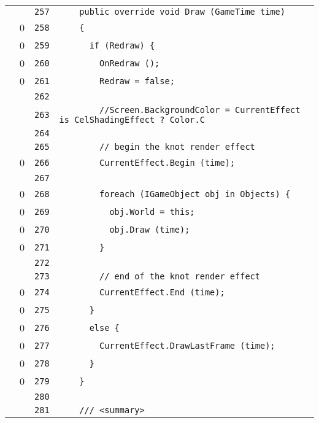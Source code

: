 \documentclass[a4paper,10pt]{article}
\begin{document}
\begin{longtable}[l]{lrrl}
\cellcolor{gray} &  & \verb~257~ & \verb~    public override void Draw (GameTime time)~\\
\cellcolor{red} & 0 & \verb~258~ & \verb~    {~\\
\cellcolor{red} & 0 & \verb~259~ & \verb~      if (Redraw) {~\\
\cellcolor{red} & 0 & \verb~260~ & \verb~        OnRedraw ();~\\
\cellcolor{red} & 0 & \verb~261~ & \verb~        Redraw = false;~\\
\cellcolor{gray} &  & \verb~262~ & \verb~~\\
\cellcolor{gray} &  & \verb~263~ & \verb~        //Screen.BackgroundColor = CurrentEffect is CelShadingEffect ? Color.C~\\
\cellcolor{gray} &  & \verb~264~ & \verb~~\\
\cellcolor{gray} &  & \verb~265~ & \verb~        // begin the knot render effect~\\
\cellcolor{red} & 0 & \verb~266~ & \verb~        CurrentEffect.Begin (time);~\\
\cellcolor{gray} &  & \verb~267~ & \verb~~\\
\cellcolor{red} & 0 & \verb~268~ & \verb~        foreach (IGameObject obj in Objects) {~\\
\cellcolor{red} & 0 & \verb~269~ & \verb~          obj.World = this;~\\
\cellcolor{red} & 0 & \verb~270~ & \verb~          obj.Draw (time);~\\
\cellcolor{red} & 0 & \verb~271~ & \verb~        }~\\
\cellcolor{gray} &  & \verb~272~ & \verb~~\\
\cellcolor{gray} &  & \verb~273~ & \verb~        // end of the knot render effect~\\
\cellcolor{red} & 0 & \verb~274~ & \verb~        CurrentEffect.End (time);~\\
\cellcolor{red} & 0 & \verb~275~ & \verb~      }~\\
\cellcolor{red} & 0 & \verb~276~ & \verb~      else {~\\
\cellcolor{red} & 0 & \verb~277~ & \verb~        CurrentEffect.DrawLastFrame (time);~\\
\cellcolor{red} & 0 & \verb~278~ & \verb~      }~\\
\cellcolor{red} & 0 & \verb~279~ & \verb~    }~\\
\cellcolor{gray} &  & \verb~280~ & \verb~~\\
\cellcolor{gray} &  & \verb~281~ & \verb~    /// <summary>~\\

\end{longtable}
\end{document}
